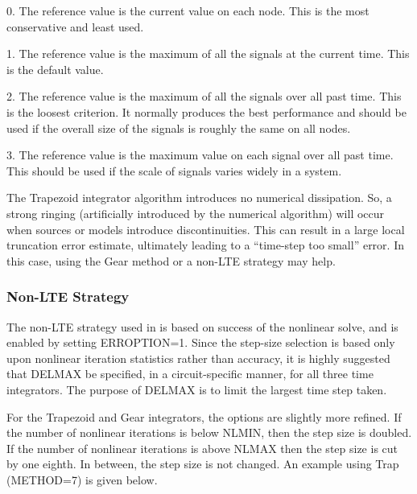 \begin{XyceItemize} 
\item 0. The reference value is the current value on each node. This is the most conservative and least used.
\item 1. The reference value is the maximum of all the signals at the current time. This is the default value.
\item 2. The reference value is the maximum of all the signals over all past time. This is the loosest criterion. It normally produces the best performance and should be used if the overall size of the signals is roughly the same on all nodes.
\item 3. The reference value is the maximum value on each signal over all past time. This should be used if the scale of signals varies widely in a system.
\end{XyceItemize}

The Trapezoid integrator algorithm introduces no numerical
dissipation.  So, a strong ringing (artificially introduced by the
numerical algorithm) will occur when sources or models introduce
discontinuities.  This can result in a large local truncation error
estimate, ultimately leading to a ``time-step too small'' error.  In
this case, using the Gear method or a non-LTE strategy may help.

\subsubsection{Non-LTE Strategy}
The non-LTE strategy used in \Xyce{} is based on success of the
nonlinear solve, and is enabled by setting ERROPTION=1.  Since the
step-size selection is based only upon nonlinear iteration statistics
rather than accuracy, it is highly suggested that DELMAX be specified,
in a circuit-specific manner, for all three time integrators.  The
purpose of DELMAX is to limit the largest time step taken.


For the Trapezoid and Gear integrators, the options are slightly more
refined.  If the number of nonlinear iterations is below NLMIN, then
the step size is doubled. If the number of nonlinear iterations is
above NLMAX then the step size is cut by one eighth.  In between, the
step size is not changed.  An example using Trap (METHOD=7) is given
below.  

